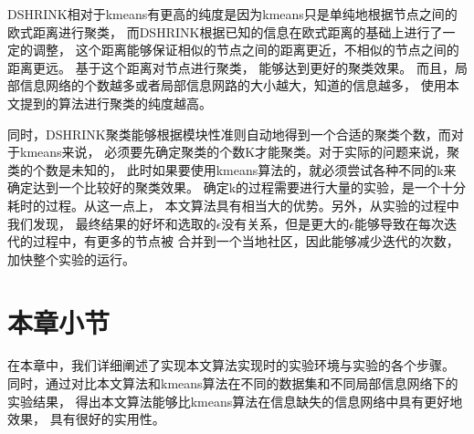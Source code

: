 DSHRINK相对于kmeans有更高的纯度是因为kmeans只是单纯地根据节点之间的欧式距离进行聚类，
而DSHRINK根据已知的信息在欧式距离的基础上进行了一定的调整，
这个距离能够保证相似的节点之间的距离更近，不相似的节点之间的距离更远。
基于这个距离对节点进行聚类，
能够达到更好的聚类效果。
而且，局部信息网络的个数越多或者局部信息网路的大小越大，知道的信息越多，
使用本文提到的算法进行聚类的纯度越高。

同时，DSHRINK聚类能够根据模块性准则自动地得到一个合适的聚类个数，而对于kmeans来说，
必须要先确定聚类的个数K才能聚类。对于实际的问题来说，聚类的个数是未知的，
此时如果要使用kmeans算法的，就必须尝试各种不同的k来确定达到一个比较好的聚类效果。
确定k的过程需要进行大量的实验，是一个十分耗时的过程。从这一点上，
本文算法具有相当大的优势。另外，从实验的过程中我们发现，
最终结果的好坏和选取的$\epsilon$没有关系，但是更大的$\epsilon$能够导致在每次迭代的过程中，有更多的节点被
合并到一个当地社区，因此能够减少迭代的次数，加快整个实验的运行。

\section{本章小节}

在本章中，我们详细阐述了实现本文算法实现时的实验环境与实验的各个步骤。
同时，通过对比本文算法和kmeans算法在不同的数据集和不同局部信息网络下的实验结果，
得出本文算法能够比kmeans算法在信息缺失的信息网络中具有更好地效果，
具有很好的实用性。
